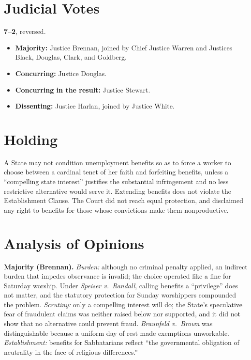\documentclass[12pt]{article}
\begin{document}
\section{Judicial Votes}

\textbf{7--2}, reversed.
\begin{itemize}
\item \textbf{Majority:} Justice Brennan, joined by Chief Justice Warren and Justices Black, Douglas, Clark, and Goldberg.
\item \textbf{Concurring:} Justice Douglas.
\item \textbf{Concurring in the result:} Justice Stewart.
\item \textbf{Dissenting:} Justice Harlan, joined by Justice White.
\end{itemize}

\section{Holding}

A State may not condition unemployment benefits so as to force a worker to choose between a cardinal tenet of her faith and forfeiting benefits, unless a ``compelling state interest'' justifies the substantial infringement and no less restrictive alternative would serve it. Extending benefits does not violate the Establishment Clause. The Court did not reach equal protection, and disclaimed any right to benefits for those whose convictions make them nonproductive.

\section{Analysis of Opinions}

\textbf{Majority (Brennan).} \textit{Burden:} although no criminal penalty applied, an indirect burden that impedes observance is invalid; the choice operated like a fine for Saturday worship. Under \textit{Speiser v.\ Randall}, calling benefits a ``privilege'' does not matter, and the statutory protection for Sunday worshippers compounded the problem. \textit{Scrutiny:} only a compelling interest will do; the State's speculative fear of fraudulent claims was neither raised below nor supported, and it did not show that no alternative could prevent fraud. \textit{Braunfeld v.\ Brown} was distinguishable because a uniform day of rest made exemptions unworkable. \textit{Establishment:} benefits for Sabbatarians reflect ``the governmental obligation of neutrality in the face of religious differences.''
\end{document}
